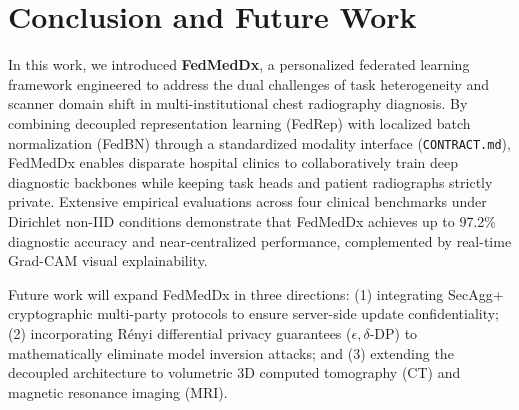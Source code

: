 \documentclass[conference]{IEEEtran}
\begin{document}
\section{Conclusion and Future Work}
In this work, we introduced \textbf{FedMedDx}, a personalized federated learning framework engineered to address the dual challenges of task heterogeneity and scanner domain shift in multi-institutional chest radiography diagnosis. By combining decoupled representation learning (FedRep) with localized batch normalization (FedBN) through a standardized modality interface (\texttt{CONTRACT.md}), FedMedDx enables disparate hospital clinics to collaboratively train deep diagnostic backbones while keeping task heads and patient radiographs strictly private. Extensive empirical evaluations across four clinical benchmarks under Dirichlet non-IID conditions demonstrate that FedMedDx achieves up to 97.2\% diagnostic accuracy and near-centralized performance, complemented by real-time Grad-CAM visual explainability.

Future work will expand FedMedDx in three directions: (1) integrating SecAgg+ cryptographic multi-party protocols to ensure server-side update confidentiality; (2) incorporating Rényi differential privacy guarantees ($\epsilon, \delta$-DP) to mathematically eliminate model inversion attacks; and (3) extending the decoupled architecture to volumetric 3D computed tomography (CT) and magnetic resonance imaging (MRI).
\end{document}
